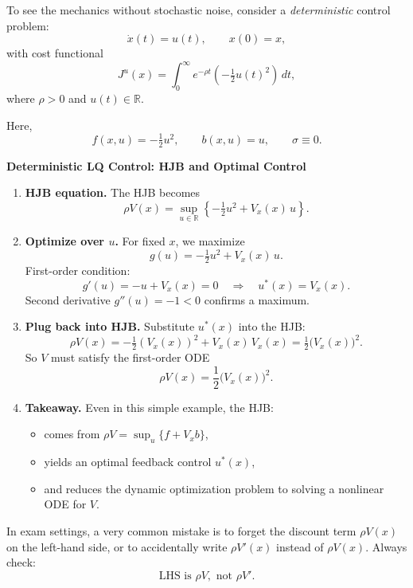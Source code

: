 \documentclass[12pt]{article}
\begin{document}
To see the mechanics without stochastic noise, consider a \emph{deterministic}
control problem:
\[
  \dot{x}(t) = u(t), \qquad x(0) = x,
\]
with cost functional
\[
  J^{u}(x) = \int_0^\infty e^{-\rho t}
  \left( -\tfrac12 u(t)^2 \right)\,dt,
\]
where $\rho>0$ and $u(t)\in\mathbb{R}$.

Here,
\[
  f(x,u) = -\tfrac12 u^2, \qquad b(x,u)=u, \qquad \sigma \equiv 0.
\]

\begin{examplebox}
\textbf{Deterministic LQ Control: HJB and Optimal Control}

\begin{enumerate}[label=(\alph*)]
  \item \textbf{HJB equation.}  
  The HJB becomes
  \[
    \rho V(x)
    = \sup_{u\in\mathbb{R}}
      \left\{
        -\tfrac12 u^2 + V_x(x)\,u
      \right\}.
  \]

  \item \textbf{Optimize over \(u\).}  
  For fixed \(x\), we maximize
  \[
    g(u) = -\tfrac12 u^2 + V_x(x)\,u.
  \]
  First-order condition:
  \[
    g'(u) = -u + V_x(x) = 0
    \quad\Rightarrow\quad
    u^\ast(x) = V_x(x).
  \]
  Second derivative \(g''(u)=-1<0\) confirms a maximum.

  \item \textbf{Plug back into HJB.}  
  Substitute \(u^\ast(x)\) into the HJB:
  \[
    \rho V(x)
    = -\tfrac12 (V_x(x))^2 + V_x(x)\,V_x(x)
    = \tfrac12 \bigl(V_x(x)\bigr)^2.
  \]
  So \(V\) must satisfy the first-order ODE
  \[
    \rho V(x) = \frac{1}{2}\bigl(V_x(x)\bigr)^2.
  \]

  \item \textbf{Takeaway.}  
  Even in this simple example, the HJB:
  \begin{itemize}
    \item comes from \(\rho V = \sup_u\{f + V_x b\}\),
    \item yields an optimal feedback control \(u^\ast(x)\),
    \item and reduces the dynamic optimization problem to solving a nonlinear ODE for \(V\).
  \end{itemize}
\end{enumerate}
\end{examplebox}

\begin{commonmistake}
In exam settings, a very common mistake is to forget the discount term
\(\rho V(x)\) on the left-hand side, or to accidentally write
\(\rho V'(x)\) instead of \(\rho V(x)\). Always check:
\[
\boxed{\text{LHS is } \rho V, \text{ not } \rho V'.}
\]
\end{commonmistake}
\end{document}
